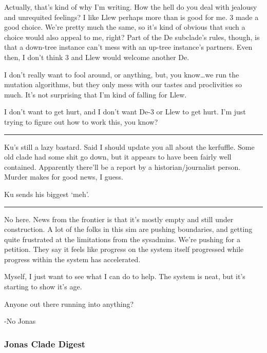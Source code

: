 Actually, that's kind of why I'm writing. How the hell do you deal with jealousy and unrequited feelings? I like Llew perhaps more than is good for me. 3 made a good choice. We're pretty much the same, so it's kind of obvious that such a choice would also appeal to me, right? Part of the De subclade's rules, though, is that a down-tree instance can't mess with an up-tree instance's partners. Even then, I don't think 3 and Llew would welcome another De.

I don't really want to fool around, or anything, but, you know\ldots{}we run the mutation algorithms, but they only mess with our tastes and proclivities so much. It's not surprising that I'm kind of falling for Llew.

I don't want to get hurt, and I don't want De-3 or Llew to get hurt. I'm just trying to figure out how to work this, you know?

\begin{center}\rule{0.5\linewidth}{\linethickness}\end{center}

Ku's still a lazy bastard. Said I should update you all about the kerfuffle. Some old clade had some shit go down, but it appears to have been fairly well contained. Apparently there'll be a report by a historian/journalist person. Murder makes for good news, I guess.

Ku sends his biggest `meh'.

\begin{center}\rule{0.5\linewidth}{\linethickness}\end{center}

No here. News from the frontier is that it's mostly empty and still under construction. A lot of the folks in this sim are pushing boundaries, and getting quite frustrated at the limitations from the sysadmins. We're pushing for a petition. They say it feels like progress on the system itself progressed while progress within the system has accelerated.

Myself, I just want to see what I can do to help. The system is neat, but it's starting to show it's age.

Anyone out there running into anything?

-No Jonas

\hypertarget{jonas-clade-digest-2}{%
\subsubsection{Jonas Clade Digest}\label{jonas-clade-digest-2}}

